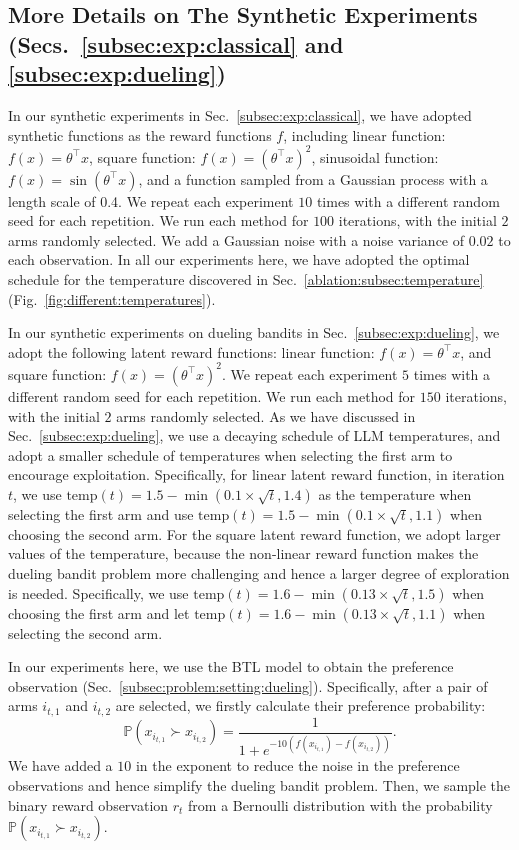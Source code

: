 \subsection{More Details on The Synthetic Experiments (Secs.~\ref{subsec:exp:classical} and \ref{subsec:exp:dueling})}
\label{app:subsec:more:details:synth:exp}
In our synthetic experiments in Sec.~\ref{subsec:exp:classical}, we have adopted synthetic functions as the reward functions $f$, including linear function: $f(x) = \theta^{\top} x$, square function: $f(x) = (\theta^{\top} x)^2$, sinusoidal function: $f(x) = \sin(\theta^{\top} x)$, and a function sampled from a Gaussian process with a length scale of 0.4.
We repeat each experiment $10$ times with a different random seed for each repetition. We run each method for $100$ iterations, with the initial $2$ arms randomly selected. We add a Gaussian noise with a noise variance of $0.02$ to each observation.
In all our experiments here, we have adopted the optimal schedule for the temperature discovered in Sec.~\ref{ablation:subsec:temperature} (Fig.~\ref{fig:different:temperatures}).

In our synthetic experiments on dueling bandits in Sec.~\ref{subsec:exp:dueling}, we adopt the following latent reward functions: linear function: $f(x) = \theta^{\top} x$, and square function: $f(x) = (\theta^{\top} x)^2$.
We repeat each experiment $5$ times with a different random seed for each repetition. We run each method for $150$ iterations, with the initial $2$ arms randomly selected.
As we have discussed in Sec.~\ref{subsec:exp:dueling}, we use a decaying schedule of LLM temperatures, and adopt a smaller schedule of temperatures when selecting the first arm to encourage exploitation. 
Specifically, for linear latent reward function, in iteration $t$, we use $\text{temp}(t) = 1.5 - \min(0.1 \times \sqrt{t}, 1.4)$ as the temperature when selecting the first arm and use $\text{temp}(t) = 1.5 - \min(0.1 \times \sqrt{t}, 1.1)$ when choosing the second arm.
For the square latent reward function, we adopt larger values of the temperature, because the non-linear reward function makes the dueling bandit problem more challenging and hence a larger degree of exploration is needed. Specifically, we use $\text{temp}(t) = 1.6 - \min(0.13 \times \sqrt{t}, 1.5)$ when choosing the first arm and let $\text{temp}(t) = 1.6 - \min(0.13 \times \sqrt{t}, 1.1)$ when selecting the second arm.

In our experiments here, we use the BTL model to obtain the preference observation (Sec.~\ref{subsec:problem:setting:dueling}).
Specifically, after a pair of arms $i_{t,1}$ and $i_{t,2}$ are selected, we firstly calculate their preference probability: 
\begin{equation}
\mathbb{P}(x_{i_{t,1}} \succ x_{i_{t,2}}) =  \frac{1}{1+e^{-10(f(x_{i_{t,1}}) - f(x_{i_{t,2}}))}}.
\end{equation}
We have added a $10$ in the exponent to reduce the noise in the preference observations and hence simplify the dueling bandit problem.
Then, we sample the binary reward observation $r_t$ from a Bernoulli distribution with the probability $\mathbb{P}(x_{i_{t,1}} \succ x_{i_{t,2}})$.



